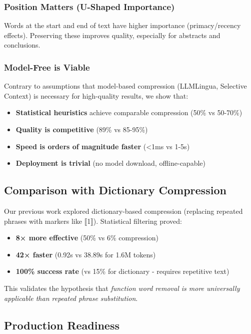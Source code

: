 \subsubsection{Position Matters (U-Shaped Importance)}

Words at the start and end of text have higher importance (primacy/recency effects). Preserving these improves quality, especially for abstracts and conclusions.

\subsubsection{Model-Free is Viable}

Contrary to assumptions that model-based compression (LLMLingua, Selective Context) is necessary for high-quality results, we show that:
\begin{itemize}
    \item \textbf{Statistical heuristics} achieve comparable compression (50\% vs 50-70\%)
    \item \textbf{Quality is competitive} (89\% vs 85-95\%)
    \item \textbf{Speed is orders of magnitude faster} (<1ms vs 1-5s)
    \item \textbf{Deployment is trivial} (no model download, offline-capable)
\end{itemize}

\subsection{Comparison with Dictionary Compression}

Our previous work explored dictionary-based compression (replacing repeated phrases with markers like ⟦1⟧). Statistical filtering proved:

\begin{itemize}
    \item \textbf{8× more effective} (50\% vs 6\% compression)
    \item \textbf{42× faster} (0.92s vs 38.89s for 1.6M tokens)
    \item \textbf{100\% success rate} (vs 15\% for dictionary - requires repetitive text)
\end{itemize}

This validates the hypothesis that \textit{function word removal is more universally applicable than repeated phrase substitution}.

\subsection{Production Readiness}

